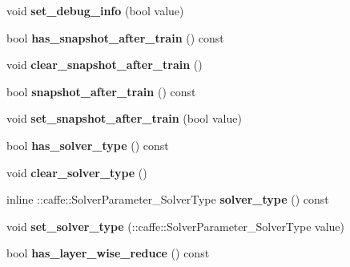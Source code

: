 \begin{DoxyCompactItemize}
void {\bfseries set\+\_\+debug\+\_\+info} (bool value)
\item 
\mbox{\label{classcaffe_1_1_solver_parameter_af50100d2b63b92f3702f1d1ddbe5b818}} 
bool {\bfseries has\+\_\+snapshot\+\_\+after\+\_\+train} () const
\item 
\mbox{\label{classcaffe_1_1_solver_parameter_aeab6df5fb1f0b4066b210c86af19deb5}} 
void {\bfseries clear\+\_\+snapshot\+\_\+after\+\_\+train} ()
\item 
\mbox{\label{classcaffe_1_1_solver_parameter_a020defc7d856eb05ed88f46b83cf2667}} 
bool {\bfseries snapshot\+\_\+after\+\_\+train} () const
\item 
\mbox{\label{classcaffe_1_1_solver_parameter_a89dd1f838c6e47fe4b14ab534b50cf2f}} 
void {\bfseries set\+\_\+snapshot\+\_\+after\+\_\+train} (bool value)
\item 
\mbox{\label{classcaffe_1_1_solver_parameter_a095c8f45e1c69a6a33c85c80a267b137}} 
bool {\bfseries has\+\_\+solver\+\_\+type} () const
\item 
\mbox{\label{classcaffe_1_1_solver_parameter_a9eb40ae6bc67bee1f35bbd3e2e047bf7}} 
void {\bfseries clear\+\_\+solver\+\_\+type} ()
\item 
\mbox{\label{classcaffe_1_1_solver_parameter_aaafd17ec2731ef6dd13ba2a80082dfc0}} 
inline \+::caffe\+::\+Solver\+Parameter\+\_\+\+Solver\+Type {\bfseries solver\+\_\+type} () const
\item 
\mbox{\label{classcaffe_1_1_solver_parameter_a8fceb86131243d2b2817e8a27217bdcd}} 
void {\bfseries set\+\_\+solver\+\_\+type} (\+::caffe\+::\+Solver\+Parameter\+\_\+\+Solver\+Type value)
\item 
\mbox{\label{classcaffe_1_1_solver_parameter_a2730782e4347d4a4519e912706012bcc}} 
bool {\bfseries has\+\_\+layer\+\_\+wise\+\_\+reduce} () const
\item 
\mbox{\label{classcaffe_1_1_solver_parameter_abfcb84c800acefd7883f7a98e82d0457}} 

\end{DoxyCompactItemize}
